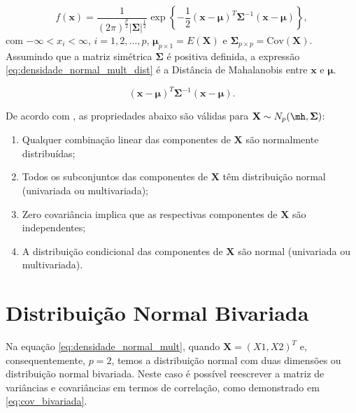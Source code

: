 \begin{equation} \label{eq:densidade_normal_mult}
f(\mathbf{x}) =  \dfrac{1}{(2\pi)^{\frac{p}{2}} |\mathbf{\Sigma}|^{\frac{1}{2}}} \exp \left\{ -\frac{1}{2} (\mathbf{x} - \mathbf{\mu})^T \mathbf{\Sigma}^{-1} (\mathbf{x} - \mathbf{\mu})\right\}, 
\end{equation} com $-\infty < x_i < \infty$, $i = 1,2,\ldots,p$, $\mathbf{\mu}_{p \times 1} = E(\mathbf{X})$ e $\mathbf{\Sigma}_{p \times p} = \mathrm{Cov}(\mathbf{X})$. Assumindo que a matriz simétrica $\mathbf{\Sigma}$ é positiva definida, a expressão \ref{eq:densidade_normal_mult_dist} é a Distância de Mahalanobis entre $\mathbf{x}$ e $\mathbf{\mu}$.

\begin{equation} \label{eq:densidade_normal_mult_dist}
(\mathbf{x} - \mathbf{\mu})^T \mathbf{\Sigma}^{-1} (\mathbf{x} - \mathbf{\mu}).
\end{equation}

De acordo com \textcite{Johnson2014}, as propriedades abaixo são válidas para $\mathbf{X} \sim N_p(\mathbf{\mh}, \mathbf{\Sigma})$:

\begin{enumerate}
    \item Qualquer combinação linear das componentes de $\mathbf{X}$ são normalmente distribuídas;
    \item Todos os subconjuntos das componentes de $\mathbf{X}$ têm distribuição normal (univariada ou multivariada);
    \item Zero covariância implica que as respectivas componentes de $\mathbf{X}$ são independentes;
    \item A distribuição condicional das componentes de $\mathbf{X}$ são normal (univariada ou multivariada).
\end{enumerate}

\section{Distribuição Normal Bivariada}

Na equação \ref{eq:densidade_normal_mult}, quando $\mathbf{X} = (X1, X2)^T$ e, consequentemente, $p = 2$, temos a distribuição normal com duas dimensões ou distribuição normal bivariada. Neste caso é possível reescrever a matriz de variâncias e covariâncias em termos de correlação, como demonstrado em \ref{eq:cov_bivariada}.

